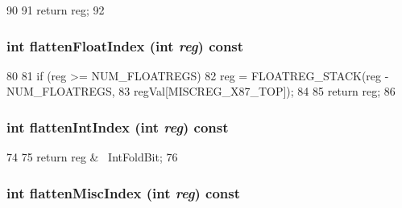 \begin{DoxyCode}
90         {
91             return reg;
92         }
\end{DoxyCode}
\hypertarget{classX86ISA_1_1ISA_a85addcd4f57c5a0ffa81805dcad1eeb7}{
\subsubsection[{flattenFloatIndex}]{\setlength{\rightskip}{0pt plus 5cm}int flattenFloatIndex (int {\em reg}) const}}
\label{classX86ISA_1_1ISA_a85addcd4f57c5a0ffa81805dcad1eeb7}



\begin{DoxyCode}
80         {
81             if (reg >= NUM_FLOATREGS) {
82                 reg = FLOATREG_STACK(reg - NUM_FLOATREGS,
83                                      regVal[MISCREG_X87_TOP]);
84             }
85             return reg;
86         }
\end{DoxyCode}
\hypertarget{classX86ISA_1_1ISA_aece4b88ffcab608652e8e9f0fbe643d4}{
\subsubsection[{flattenIntIndex}]{\setlength{\rightskip}{0pt plus 5cm}int flattenIntIndex (int {\em reg}) const}}
\label{classX86ISA_1_1ISA_aece4b88ffcab608652e8e9f0fbe643d4}



\begin{DoxyCode}
74         {
75             return reg & ~IntFoldBit;
76         }
\end{DoxyCode}
\hypertarget{classX86ISA_1_1ISA_a8997760aa4425793911f57440a4dd8ae}{
\subsubsection[{flattenMiscIndex}]{\setlength{\rightskip}{0pt plus 5cm}int flattenMiscIndex (int {\em reg}) const}}
\label{classX86ISA_1_1ISA_a8997760aa4425793911f57440a4dd8ae}



